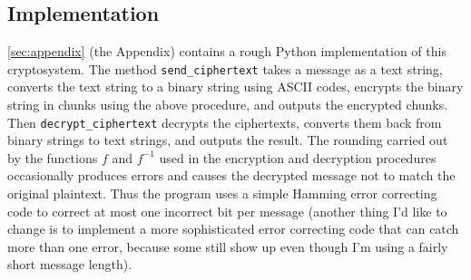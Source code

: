 \subsection{Implementation}
\autoref{sec:appendix} (the Appendix) contains a rough Python implementation
of this cryptosystem. The method \verb|send_ciphertext| takes a message
as a text string, converts the text string to a binary string using
ASCII codes, encrypts the binary string in chunks using the above procedure, and outputs the
encrypted chunks. Then \verb|decrypt_ciphertext| decrypts the ciphertexts, converts them back from binary strings to text strings, and outputs
the result. The rounding carried out by the functions $f$ and $f^{-1}$
used in the encryption and decryption procedures occasionally produces
errors and causes the decrypted message not to match the original plaintext.
Thus the program uses a simple Hamming error correcting code to correct at
most one incorrect bit per message (another thing I'd like to change is to implement a more sophisticated error correcting code that can catch
more than one error, because some still show up even though I'm using
a fairly short message length). 
